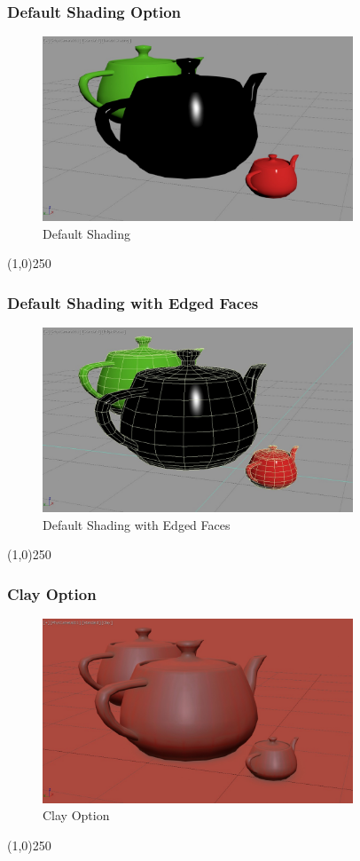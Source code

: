 \begin{frame}
\frametitle{Default Shading Option}
\begin{figure}
	\centering
	\includegraphics[height=5.5cm]{img/ViewportOptions/DefaultShading.jpg}
	\caption{Default Shading}
	\label{fig:DefaultShading}
\end{figure}
\end{frame}
\begin{center}\line(1,0){250}\end{center}

\begin{frame}
\frametitle{Default Shading with Edged Faces}
\begin{figure}
	\centering
	\includegraphics[height=5.5cm]{img/ViewportOptions/DefaultShadingEdgedFaces.jpg}
	\caption{Default Shading with Edged Faces}
	\label{fig:DefaultEdged}
\end{figure}
\end{frame}
\begin{center}\line(1,0){250}\end{center}

\begin{frame}
\frametitle{Clay Option}
\begin{figure}
	\centering
	\includegraphics[height=5.5cm]{img/ViewportOptions/Clay.jpg}
	\caption{Clay Option}
	\label{fig:ClayOption}
\end{figure}
\end{frame}
\begin{center}\line(1,0){250}\end{center}



